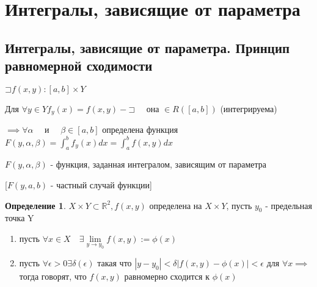 \documentclass[a4paper]{article}
\newcommand\letsymbol{\mathord{\sqsupset}}
\theoremstyle{definition}
\newtheorem*{definition}{Определение}
\theoremstyle{remark}
\begin{document}
    \tableofcontents
    \section{Интегралы, зависящие от параметра}
    \subsection{	Интегралы, зависящие от параметра. Принцип равномерной сходимости}
    $\letsymbol f(x,y): [a, b]\times Y$

    Для $\forall y \in Y f_y(x) = f(x,y) - \letsymbol\quad$ она $\in R([a, b])$ (интегрируема)
    
    $\implies \forall \alpha\quad$ и $\quad\beta\in[a,b]$ определена функция $F(y, \alpha, \beta) = \int_{a}^{b} f_y(x)dx = \int_{a}^{b} f(x, y)dx$

    $F(y, \alpha, \beta)$ - функция, заданная интегралом, зависящим от параметра

    [$F(y, a, b)$ - частный случай функции]

    \begin{definition}
        $X\times Y \subset \mathbb{R}^2, f(x,y)$ определена на $X\times Y$, пусть $y_0$ - предельная точка Y
   \begin{enumerate}
        \item пусть $\forall x \in X \quad \exists \lim\limits_{y\to y_0}f(x,y):=\phi(x)$
        \item пусть $\forall \epsilon >0 \exists \delta(\epsilon)$ такая что $|y - y_0|<\delta |f(x,y) - \phi(x)|< \epsilon$ для $\forall x \implies$ тогда говорят, что $f(x,y)$ равномерно сходится к $\phi(x)$ 
      \end{enumerate}
   \end{definition}
\end{document}
